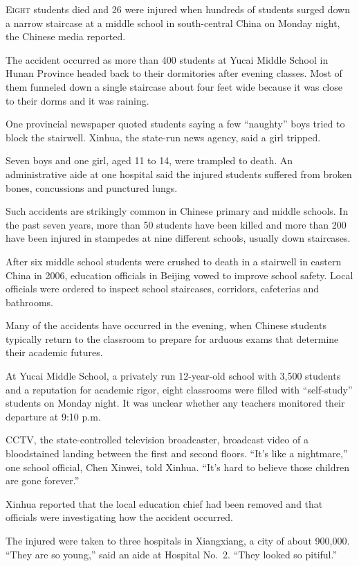 ﻿\documentclass[12pt]{article}
\begin{document}
\lettrine{E}{ight} students died and 26 were injured when hundreds of
students surged down a narrow staircase at a middle school in south-central China on Monday night,
the Chinese media reported.

The accident occurred as more than 400 students at Yucai Middle School in Hunan Province headed back
to their dormitories after evening classes. Most of them funneled down a single staircase about four
feet wide because it was close to their dorms and it was raining.

One provincial newspaper quoted students saying a few ``naughty'' boys tried to block the stairwell.
Xinhua, the state-run news agency, said a girl tripped.

Seven boys and one girl, aged 11 to 14, were trampled to death. An administrative aide at one
hospital said the injured students suffered from broken bones, concussions and punctured lungs.

Such accidents are strikingly common in Chinese primary and middle schools. In the past seven years,
more than 50 students have been killed and more than 200 have been injured in stampedes at nine
different schools, usually down staircases.

After six middle school students were crushed to death in a stairwell in eastern China in 2006,
education officials in Beijing vowed to improve school safety. Local officials were ordered to
inspect school staircases, corridors, cafeterias and bathrooms.

Many of the accidents have occurred in the evening, when Chinese students typically return to the
classroom to prepare for arduous exams that determine their academic futures.

At Yucai Middle School, a privately run 12-year-old school with 3,500 students and a reputation for
academic rigor, eight classrooms were filled with ``self-study'' students on Monday night. It was
unclear whether any teachers monitored their departure at 9:10 p.m.

CCTV, the state-controlled television broadcaster, broadcast video of a bloodstained landing between
the first and second floors. ``It's like a nightmare,'' one school official, Chen Xinwei, told
Xinhua. ``It's hard to believe those children are gone forever.''

Xinhua reported that the local education chief had been removed and that officials were
investigating how the accident occurred.

The injured were taken to three hospitals in Xiangxiang, a city of about 900,000. ``They are so
young,'' said an aide at Hospital No.~2. ``They looked so pitiful.''
\end{document}
